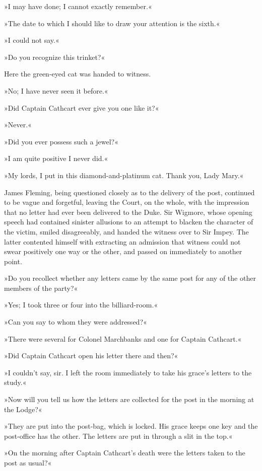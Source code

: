 »I may have done; I cannot exactly remember.«

»The date to which I should like to draw your attention is the sixth.«

»I could not say.«

»Do you recognize this trinket?«

Here the green-eyed cat was handed to witness.

»No; I have never seen it before.«

»Did Captain Cathcart ever give you one like it?«

»Never.«

»Did you ever possess such a jewel?«

»I am quite positive I never did.«

»My lords, I put in this diamond-and-platinum cat. Thank you, Lady Mary.«

James Fleming, being questioned closely as to the delivery of the post, continued to be vague and forgetful, leaving the Court, on the whole, with the impression that no letter had ever been delivered to the Duke.  Sir Wigmore, whose opening speech had contained sinister allusions to an attempt to blacken the character of the victim, smiled disagreeably, and handed the witness over to Sir Impey. The latter contented himself with extracting an admission that witness could not swear positively one way or the other, and passed on immediately to another point.

»Do you recollect whether any letters came by the same post for any of the other members of the party?«

»Yes; I took three or four into the billiard-room.«

»Can you say to whom they were addressed?«

»There were several for Colonel Marchbanks and one for Captain Cathcart.«

»Did Captain Cathcart open his letter there and then?«

»I couldn't say, sir. I left the room immediately to take his grace's letters to the study.«

»Now will you tell us how the letters are collected for the post in the morning at the Lodge?«

»They are put into the post-bag, which is locked. His grace keeps one key and the post-office has the other. The letters are put in through a slit in the top.«

»On the morning after Captain Cathcart's death were the letters taken to the post as usual?«

